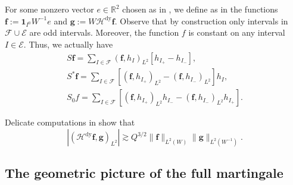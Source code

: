 \documentclass{amsart}
\newcommand{\R}{\mathbb{R}}
\theoremstyle{definition}
\theoremstyle{remark}
\begin{document}
For some nonzero vector $e\in\R^2$ chosen as in \cite[Lemma 5.1]{DoPeTrVo}, we define as in \cite[Sections 6 and 7]{DoPeTrVo} the functions $\mathbf{f}:=\mathbf{1}_{I^{0}}W^{-1}e$ and $\mathbf{g}:=W\mathcal{H}^{\mathrm{dy}}\mathbf{f}$. Observe that by construction only intervals in $\mathscr{F}\cup\mathscr{E}$ are odd intervals. Moreover, the function $f$ is constant on any interval $I\in\mathscr{E}$. Thus, we actually have
\begin{gather*}
    S\mathbf{f}=\sum_{I\in\mathscr{F}}(\mathbf{f},h_{I})_{L^2}[h_{I_{+}}-h_{I_{-}}],\\
    S^{*}\mathbf{f}=\sum_{I\in\mathscr{F}}[(\mathbf{f},h_{I_{+}})_{L^2}-(\mathbf{f},h_{I_{-}})_{L^2}]h_{I},\\
    S_0f=\sum_{I\in\mathscr{F}}[(\mathbf{f},h_{I_{+}})_{L^2}h_{I_{-}}-(\mathbf{f},h_{I_{-}})_{L^2}h_{I_{+}}].
\end{gather*}

Delicate computations in \cite[Section 6]{DoPeTrVo} show that
\begin{equation*}
    |(\mathcal{H}^{\mathrm{dy}}\mathbf{f},\mathbf{g})_{L^2}|\gtrsim Q^{3/2}\|\mathbf{f}\|_{L^2(W)}\|\mathbf{g}\|_{L^2(W^{-1})}.
\end{equation*}

\subsection{The geometric picture of the full martingale}
\end{document}
